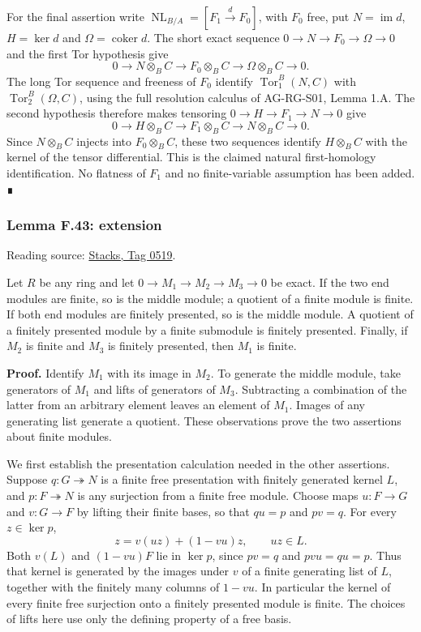 \documentclass[11pt,a4paper,openany]{report}
\begin{document}
For the final assertion write \(\operatorname{NL}_{B/A}=[F_1\xrightarrow{d}F_0]\), with \(F_0\) free, put \(N=\operatorname{im}d\), \(H=\ker d\) and \(\Omega=\operatorname{coker}d\). The short exact sequence \(0\to N\to F_0\to\Omega\to0\) and the first Tor hypothesis give \[0\longrightarrow N\otimes_BC\longrightarrow F_0\otimes_BC
\longrightarrow\Omega\otimes_BC\longrightarrow0.\] The long Tor sequence and freeness of \(F_0\) identify \(\operatorname{Tor}_1^B(N,C)\) with \(\operatorname{Tor}_2^B(\Omega,C)\), using the full resolution calculus of AG-RG-S01, Lemma 1.A. The second hypothesis therefore makes tensoring \(0\to H\to F_1\to N\to0\) give \[0\longrightarrow H\otimes_BC\longrightarrow F_1\otimes_BC
\longrightarrow N\otimes_BC\longrightarrow0.\] Since \(N\otimes_BC\) injects into \(F_0\otimes_BC\), these two sequences identify \(H\otimes_BC\) with the kernel of the tensor differential. This is the claimed natural first-homology identification. No flatness of \(F_1\) and no finite-variable assumption has been added. ∎

\label{AG-RG-S05-algebra-lemma-extension}

\subsubsection{Lemma F.43: extension}\label{AG-RG-S05-lemma-f.43-extension}

Reading source: \href{https://stacks.math.columbia.edu/tag/0519}{Stacks, Tag 0519}.

Let \(R\) be any ring and let \(0\to M_1\to M_2\to M_3\to0\) be exact. If the two end modules are finite, so is the middle module; a quotient of a finite module is finite. If both end modules are finitely presented, so is the middle module. A quotient of a finitely presented module by a finite submodule is finitely presented. Finally, if \(M_2\) is finite and \(M_3\) is finitely presented, then \(M_1\) is finite.

\textbf{Proof.} Identify \(M_1\) with its image in \(M_2\). To generate the middle module, take generators of \(M_1\) and lifts of generators of \(M_3\). Subtracting a combination of the latter from an arbitrary element leaves an element of \(M_1\). Images of any generating list generate a quotient. These observations prove the two assertions about finite modules.

We first establish the presentation calculation needed in the other assertions. Suppose \(q : G\twoheadrightarrow N\) is a finite free presentation with finitely generated kernel \(L\), and \(p : F\twoheadrightarrow N\) is any surjection from a finite free module. Choose maps \(u : F\to G\) and \(v : G\to F\) by lifting their finite bases, so that \(qu=p\) and \(pv=q\). For every \(z\in\ker p\), \[
z=v(uz)+(1-vu)z,
\qquad uz\in L.
\] Both \(v(L)\) and \((1-vu)F\) lie in \(\ker p\), since \(pv=q\) and \(pvu=qu=p\). Thus that kernel is generated by the images under \(v\) of a finite generating list of \(L\), together with the finitely many columns of \(1-vu\). In particular the kernel of every finite free surjection onto a finitely presented module is finite. The choices of lifts here use only the defining property of a free basis.
\end{document}
